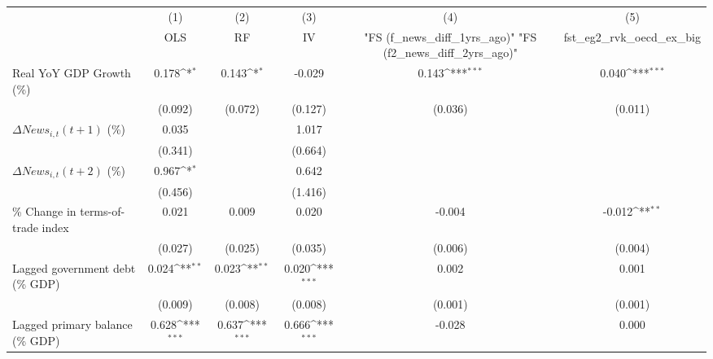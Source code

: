 {
\def\sym#1{\ifmmode^{#1}\else\(^{#1}\)\fi}
\begin{tabular}{l*{5}{c}}
\toprule
                    &\multicolumn{1}{c}{(1)}&\multicolumn{1}{c}{(2)}&\multicolumn{1}{c}{(3)}&\multicolumn{1}{c}{(4)}&\multicolumn{1}{c}{(5)}\\
                    &\multicolumn{1}{c}{OLS}&\multicolumn{1}{c}{RF}&\multicolumn{1}{c}{IV}&\multicolumn{1}{c}{ "FS (f_news_diff_1yrs_ago)"  "FS (f2_news_diff_2yrs_ago)" }&\multicolumn{1}{c}{fst_eg2_rvk_oecd_ex_big}\\
\midrule
Real YoY GDP Growth (\%)&       0.178\sym{*}  &       0.143\sym{*}  &      -0.029         &       0.143\sym{***}&       0.040\sym{***}\\
                    &     (0.092)         &     (0.072)         &     (0.127)         &     (0.036)         &     (0.011)         \\
\addlinespace
$ \Delta News_{i,t}(t+1)$ (\%)&       0.035         &                     &       1.017         &                     &                     \\
                    &     (0.341)         &                     &     (0.664)         &                     &                     \\
\addlinespace
$ \Delta News_{i,t}(t+2)$ (\%)&       0.967\sym{*}  &                     &       0.642         &                     &                     \\
                    &     (0.456)         &                     &     (1.416)         &                     &                     \\
\addlinespace
\% Change in terms-of-trade index&       0.021         &       0.009         &       0.020         &      -0.004         &      -0.012\sym{**} \\
                    &     (0.027)         &     (0.025)         &     (0.035)         &     (0.006)         &     (0.004)         \\
\addlinespace
Lagged government debt (\% GDP)&       0.024\sym{**} &       0.023\sym{**} &       0.020\sym{***}&       0.002         &       0.001         \\
                    &     (0.009)         &     (0.008)         &     (0.008)         &     (0.001)         &     (0.001)         \\
\addlinespace
Lagged primary balance (\% GDP)&       0.628\sym{***}&       0.637\sym{***}&       0.666\sym{***}&      -0.028         &       0.000         \\

\end{tabular}}
